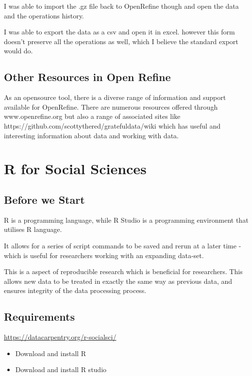 \documentclass{article}
\begin{document}
I was able to import the .gz file back to OpenRefine though and open the data and the operations history.

I was able to export the data as a csv and open it in excel. however this form doesn't preserve all the operations as well, which I believe the standard export would do.


\subsection{Other Resources in Open Refine}

As an opensource tool, there is a diverse range of information and support available for OpenRefine. 
There are numerous resources offered through www.openrefine.org but also a range of associated sites like https://github.com/scottythered/gratefuldata/wiki which has useful and interesting information about data and working with data.


\section{R for Social Sciences}
\subsection{Before we Start}

R is a programming language, while R Studio is a programming environment that utilises R language.

It allows for a series of script commands to be saved and rerun at a later time - which is useful for researchers working with an expanding data-set. 

This is a aspect of reproducible research which is beneficial for researchers. This allows new data to be treated in exactly the same way as previous data, and ensures integrity of the data processing process. 

\subsection{Requirements}

\url{https://datacarpentry.org/r-socialsci/}

\begin{itemize}
    \item Download and install R
    \item Download and install R studio
\end{itemize}
\end{document}
